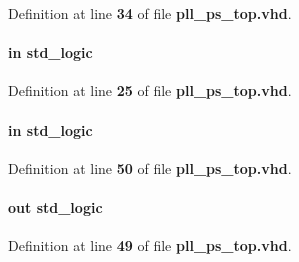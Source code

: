 Definition at line {\bf 34} of file {\bf pll\+\_\+ps\+\_\+top.\+vhd}.

\paragraph[{reset\+\_\+n}]{ {\bfseries \textcolor{keywordflow}{in}\textcolor{vhdlchar}{ }} {\bfseries \textcolor{comment}{std\+\_\+logic}\textcolor{vhdlchar}{ }} \hspace{0.3cm}{\ttfamily [Port]}}\label{classpll__ps__top_a446ea52ed8c4a84181a47d9165ce41a5}


Definition at line {\bf 25} of file {\bf pll\+\_\+ps\+\_\+top.\+vhd}.

\paragraph[{smpl\+\_\+cmp\+\_\+done}]{ {\bfseries \textcolor{keywordflow}{in}\textcolor{vhdlchar}{ }} {\bfseries \textcolor{comment}{std\+\_\+logic}\textcolor{vhdlchar}{ }} \hspace{0.3cm}{\ttfamily [Port]}}\label{classpll__ps__top_a7cefce4dde1ccb9ca521e02c5f2f9044}


Definition at line {\bf 50} of file {\bf pll\+\_\+ps\+\_\+top.\+vhd}.

\paragraph[{smpl\+\_\+cmp\+\_\+en}]{ {\bfseries \textcolor{keywordflow}{out}\textcolor{vhdlchar}{ }} {\bfseries \textcolor{comment}{std\+\_\+logic}\textcolor{vhdlchar}{ }} \hspace{0.3cm}{\ttfamily [Port]}}\label{classpll__ps__top_abde511db8e14b8bf12a4d291e0991cb1}


Definition at line {\bf 49} of file {\bf pll\+\_\+ps\+\_\+top.\+vhd}.

